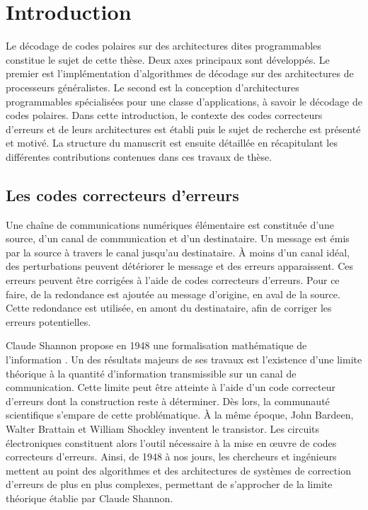 \chapter*{Introduction}

Le décodage de codes polaires sur des architectures dites programmables constitue le sujet de cette thèse. Deux axes principaux sont développés. Le premier est l'implémentation d'algorithmes de décodage sur des architectures de processeurs généralistes. Le second est la conception d'architectures programmables spécialisées pour une classe d'applications, à savoir le décodage de codes polaires. Dans cette introduction, le contexte des codes correcteurs d'erreurs et de leurs architectures est établi puis le sujet de recherche est présenté et motivé. La structure du manuscrit est ensuite détaillée en récapitulant les différentes contributions contenues dans ces travaux de thèse.

\section*{Les codes correcteurs d'erreurs}

Une chaîne de communications numériques élémentaire est constituée d'une source, d'un canal de communication et d'un destinataire. Un message est émis par la source à travers le canal jusqu'au destinataire. \`A moins d'un canal idéal, des perturbations peuvent détériorer le message et des erreurs apparaissent. Ces erreurs peuvent être corrigées à l'aide de codes correcteurs d'erreurs. Pour ce faire, de la redondance est ajoutée au message d'origine, en aval de la source. Cette redondance est utilisée, en amont du destinataire, afin de corriger les erreurs potentielles.

Claude Shannon propose en 1948 une formalisation mathématique de l'information \cite{shannon_mathematical_2001}. Un des résultats majeurs de ses travaux est l’existence d'une limite théorique à la quantité d'information transmissible sur un canal de communication. Cette limite peut être atteinte à l'aide d'un code correcteur d'erreurs dont la construction reste à déterminer.
Dès lors, la communauté scientifique s'empare de cette problématique.
\`A la même époque, John Bardeen, Walter Brattain et William Shockley inventent le transistor. Les circuits électroniques constituent alors l'outil nécessaire à la mise en œuvre de codes correcteurs d'erreurs. Ainsi, de 1948 à nos jours, les chercheurs et ingénieurs mettent au point des algorithmes et des architectures de systèmes de correction d'erreurs de plus en plus complexes, permettant de s'approcher de la limite théorique établie par Claude Shannon.


